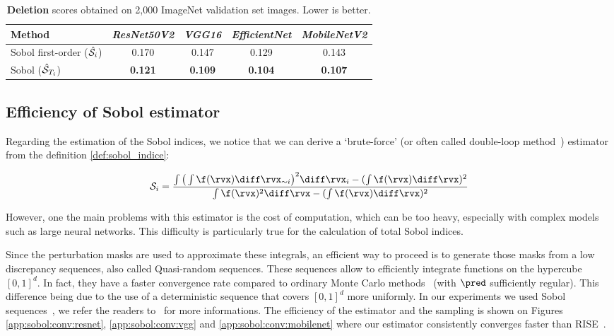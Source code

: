 \begin{table*}[ht]
\centering
\begin{tabular}{lcccc}
\toprule
Method & \textit{ResNet50V2} & \textit{VGG16} & \textit{EfficientNet} & \textit{MobileNetV2} \\
\midrule  
Sobol first-order ($\hat{\mathcal{S}}_{i}$) & 0.170 & 0.147 & 0.129 & 0.143 \\  
Sobol ($\hat{\mathcal{S}}_{T_i}$) & \textbf{0.121} & \textbf{0.109} & \textbf{0.104} & \textbf{0.107} \\  
\bottomrule
\end{tabular}
\caption{\textbf{Deletion} scores obtained on 2,000 ImageNet validation set images. Lower is better. 
}\label{app:sobol:deletion_first_vs_higher}
\end{table*}

\subsection{Efficiency of Sobol estimator}\label{app:sobol:efficient}
Regarding the estimation of the Sobol indices, we notice that we can derive a `brute-force' (or often called double-loop method~\cite{sobol2001}) estimator from the definition \ref{def:sobol_indice}:

\begin{equation}
    \label{eq:sobol_double_loop}
    \sob_i = \frac{ \int \big( \int \f(\rvx) \diff \rvx_{\sim i} \big)^2 \diff \rvx_i -  ( \int \f(\rvx) \diff \rvx)^2 }
             {\int \f(\rvx)^2 \diff \rvx - ( \int \f(\rvx) \diff \rvx )^2 }
\end{equation}

However, one the main problems with this estimator is the cost of computation, which can be too heavy, especially with complex models such as large neural networks. This difficulty is particularly true for the calculation of total Sobol indices. 

Since the perturbation masks are used to approximate these integrals, an efficient way to proceed is to generate those masks from a low discrepancy sequences, also called Quasi-random sequences. These sequences allow to efficiently integrate functions on the hypercube $[0, 1]^d$. In fact, they have a faster convergence rate compared to ordinary Monte Carlo methods~\cite{gerber2015} (with $\pred$ sufficiently regular). This difference being due to the use of a deterministic sequence that covers $[0, 1]^d$ more uniformly.
In our experiments we used Sobol sequences~\cite{sobol1967sequence}, we refer the readers to~\cite{leobacher2014introduction} for more informations.
The efficiency of the estimator and the sampling is shown on Figures \ref{app:sobol:conv:resnet}, \ref{app:sobol:conv:vgg} and \ref{app:sobol:conv:mobilenet} where our estimator consistently converges faster than RISE~\cite{petsiuk2018rise}.

